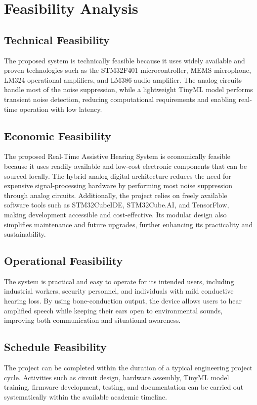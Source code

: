 \chapter{Feasibility Analysis}
\section{Technical Feasibility}
The proposed system is technically feasible because it uses widely available and proven technologies such as the STM32F401 microcontroller, MEMS microphone, LM324 operational amplifiers, and LM386 audio amplifier. The analog circuits handle most of the noise suppression, while a lightweight TinyML model performs transient noise detection, reducing computational requirements and enabling real-time operation with low latency.
\section{Economic Feasibility}
The proposed Real-Time Assistive Hearing System is economically feasible because it uses readily available and low-cost electronic components that can be sourced locally. The hybrid analog-digital architecture reduces the need for expensive signal-processing hardware by performing most noise suppression through analog circuits. Additionally, the project relies on freely available software tools such as STM32CubeIDE, STM32Cube.AI, and TensorFlow, making development accessible and cost-effective. Its modular design also simplifies maintenance and future upgrades, further enhancing its practicality and sustainability.
\section{Operational Feasibility}
The system is practical and easy to operate for its intended users, including industrial workers, security personnel, and individuals with mild conductive hearing loss. By using bone-conduction output, the device allows users to hear amplified speech while keeping their ears open to environmental sounds, improving both communication and situational awareness.
\section{Schedule Feasibility}
The project can be completed within the duration of a typical engineering project cycle. Activities such as circuit design, hardware assembly, TinyML model training, firmware development, testing, and documentation can be carried out systematically within the available academic timeline.
